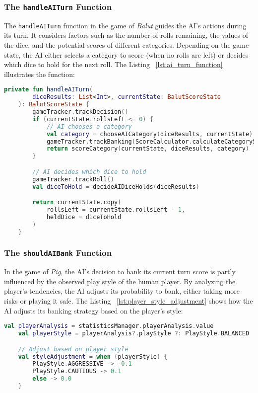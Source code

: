\subsubsection{The \texttt{handleAITurn} Function}

The \texttt{handleAITurn} function in the game of \emph{Balut} guides the AI's actions during its turn. It considers factors such as the number of rolls remaining, the values of the dice, and the potential scores of different categories. Depending on the game state, the AI either selects a category to score (when no rolls are left) or decides which dice to hold for the next roll. The Listing ~\ref{lst:ai_turn_function}  illustrates the function:

\begin{lstlisting}[language=Kotlin, caption={handleAITurn Function}, label=lst:ai_turn_function]
    private fun handleAITurn(
        diceResults: List<Int>, currentState: BalutScoreState
    ): BalutScoreState {
        gameTracker.trackDecision()
        if (currentState.rollsLeft <= 0) {
            // AI chooses a category
            val category = chooseAICategory(diceResults, currentState)
            gameTracker.trackBanking(ScoreCalculator.calculateCategoryScore(diceResults, category))
            return scoreCategory(currentState, diceResults, category)
        }

        // AI decides which dice to hold
        gameTracker.trackRoll()
        val diceToHold = decideAIDiceHolds(diceResults)

        return currentState.copy(
            rollsLeft = currentState.rollsLeft - 1,
            heldDice = diceToHold
        )
    }
\end{lstlisting}

\subsubsection{The \texttt{shouldAIBank} Function}

In the game of \emph{Pig}, the AI's decision to bank its current turn score is partly influenced by the observed play style of the human player. By analyzing the player's tendencies, the AI adjusts its probability to bank, either taking more risks or playing it safe. The Listing ~\ref{lst:player_style_adjustment} shows how the AI adjusts its banking strategy based on the player's style:

\begin{lstlisting}[language=Kotlin, caption={Player Style Adjustment}, label=lst:player_style_adjustment]
    val playerAnalysis = statisticsManager.playerAnalysis.value
    val playerStyle = playerAnalysis?.playStyle ?: PlayStyle.BALANCED

    // Adjust based on player style
    val styleAdjustment = when (playerStyle) {
        PlayStyle.AGGRESSIVE -> -0.1
        PlayStyle.CAUTIOUS -> 0.1
        else -> 0.0
    }
\end{lstlisting}

